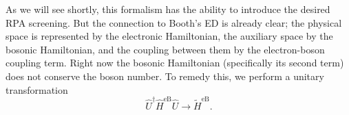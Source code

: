 As we will see shortly, this formalism has the ability to introduce the desired RPA screening. But the connection to Booth's ED is already clear; the physical space is represented by the electronic Hamiltonian, the auxiliary space by the bosonic Hamiltonian, and the coupling between them by the electron-boson coupling term. Right now the bosonic Hamiltonian (specifically its second term) does not conserve the boson number. To remedy this, we perform a unitary transformation
\begin{equation}
\hat{U}^{\dagger} \hat{H}^{\mathrm{eB}} \hat{U} \rightarrow \tilde{H}^{\mathrm{eB}}.
\end{equation}
